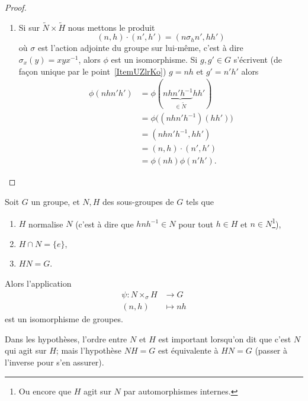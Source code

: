\begin{proof}
\begin{enumerate}
        \item
            Si sur \( \tilde N\times \tilde H\) nous mettons le produit
            \begin{equation}
                (n,h)\cdot(n',h')=(n\sigma_hn',hh')
            \end{equation}
            où \( \sigma\) est l'action adjointe du groupe sur lui-même, c'est à dire \( \sigma_x(y)=xyx^{-1}\), alors \( \phi\) est un isomorphisme. Si \( g,g'\in G\) s'écrivent (de façon unique par le point~\ref{ItemUZlrKo}) \( g=nh\) et \( g'=n'h'\) alors
            \begin{subequations}
                \begin{align}
                    \phi(nhn'h')&=\phi(n\underbrace{hn'h^{-1}}_{\in \tilde N}hh')\\
                    &=\phi\big( (nhn'h^{-1})(hh') \big)\\
                    &=(nhn'h^{-1},hh')\\
                    &=(n,h)\cdot(n',h')\\
                    &=\phi(nh)\phi(n'h').
                \end{align}
            \end{subequations}
    \end{enumerate}
\end{proof}

\begin{corollary}\label{CoroGohOZ}
    Soit \( G\) un groupe, et \( N,H\) des sous-groupes de \( G\) tels que
    \begin{enumerate}
        \item
            \( H\) normalise \( N\) (c'est à dire que \( hnh^{-1}\in N\) pour tout \( h\in H\) et \( n\in N\)\footnote{Ou encore que \( H\) agit sur \( N\) par automorphismes internes.}),
        \item
            \( H\cap N=\{ e \}\),
        \item
            \( HN=G\).
    \end{enumerate}
    Alors l'application
    \begin{equation}
        \begin{aligned}
            \psi\colon N\times_{\sigma}H&\to G \\
            (n,h)&\mapsto nh
        \end{aligned}
    \end{equation}
    est un isomorphisme de groupes.
\end{corollary}
Dans les hypothèses, l'ordre entre \( N\) et \( H\) est important lorsqu'on dit que c'est \( N\) qui agit sur \( H\); mais l'hypothèse \( NH=G\) est équivalente à \( HN=G\) (passer à l'inverse pour s'en assurer).

